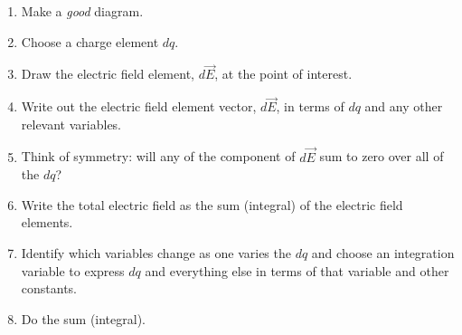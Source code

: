 \begin{enumerate}
\item Make a \textit{good} diagram.
\item Choose a charge element $dq$.
\item Draw the electric field element, $d\vec E$, at the point of interest.
\item Write out the electric field element vector, $d\vec E$, in terms of $dq$ and any other relevant variables.
\item Think of symmetry: will any of the component of $d\vec E$ sum to zero over all of the $dq$?
\item Write the total electric field as the sum (integral) of the electric field elements.
\item Identify which variables change as one varies the $dq$ and choose an integration variable to express $dq$ and everything else in terms of that variable and other constants.
\item Do the sum (integral).
\end{enumerate}


